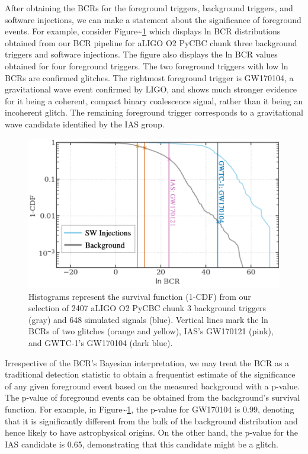 \documentclass[%
 reprint,
 amsmath,amssymb,
 aps,
]{revtex4-2}
\begin{document}
After obtaining the BCRs for the foreground triggers, background triggers, and software injections, we can make a
statement about the significance of foreground events. For example, consider Figure\textasciitilde\ref{fig:bcrCdf} which displays ln
BCR distributions obtained from our BCR pipeline for aLIGO O2 PyCBC chunk three background triggers and software injections.
The figure also displays the ln BCR values obtained for four foreground triggers. The two foreground triggers with low
ln BCRs are confirmed glitches. The rightmost foreground trigger is GW170104, a gravitational wave event confirmed by
LIGO, and shows much stronger evidence for it being a coherent, compact binary coalescence signal, rather than it being
an incoherent glitch. The remaining foreground trigger corresponds to a gravitational wave candidate identified by the
IAS group.



\begin{figure}[!h]

{\centering \includegraphics[width=0.75\linewidth]{images/bcr_cdf} 

}

\caption[BCR distribution example]{Histograms represent the survival function (1-CDF) from our selection of 2407 aLIGO O2 PyCBC chunk 3 background triggers (gray) and 648 simulated signals (blue). Vertical lines mark the ln BCRs of two glitches (orange and yellow), IAS's GW170121 (pink), and GWTC-1's GW170104 (dark blue).}\label{fig:bcrCdf}
\end{figure}

Irrespective of the BCR's Bayesian interpretation, we may treat the BCR as a traditional detection statistic to obtain a
frequentist estimate of the significance of any given foreground event based on the measured background with a p-value.
The p-value of foreground events can be obtained from the background's survival function. For example, in
Figure\textasciitilde\ref{fig:bcrCdf}, the p-value for GW170104 is 0.99, denoting that it is significantly different from the bulk
of the background distribution and hence likely to have astrophysical origins. On the other hand, the p-value for the
IAS candidate is 0.65, demonstrating that this candidate might be a glitch.
\end{document}
